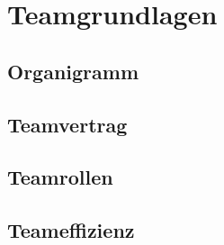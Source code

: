 \chapter{Teamgrundlagen}

\section{Organigramm}

\section{Teamvertrag}

\section{Teamrollen}

\section{Teameffizienz}



